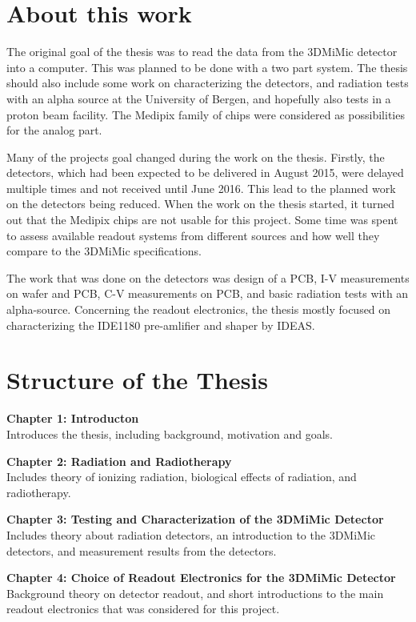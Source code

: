 \documentclass[../main/thesis.tex]{subfiles}
\begin{document}
\section{About this work}
\label{i-goal}

The original goal of the thesis was to read the data from the 3DMiMic detector into a computer. This was planned to be done with a two part system. The thesis should also include some work on characterizing the detectors, and radiation tests with an alpha source at the University of Bergen, and hopefully also tests in a proton beam facility. The Medipix family of chips were considered as possibilities for the analog part.

Many of the projects goal changed during the work on the thesis. Firstly, the detectors, which had been expected to be delivered in August 2015, were delayed multiple times and not received until June 2016. This lead to the planned work on the detectors being reduced. When the work on the thesis started, it turned out that the Medipix chips are not usable for this project. Some time was spent to assess available readout systems from different sources and how well they compare to the 3DMiMic specifications.

The work that was done on the detectors was design of a PCB, I-V measurements on wafer and PCB, C-V measurements on PCB, and basic radiation tests with an alpha-source. Concerning the readout electronics, the thesis mostly focused on characterizing the IDE1180 pre-amlifier and shaper by IDEAS.

\section{Structure of the Thesis}
\label{i-structure}
\textbf{Chapter 1: Introducton}\\
Introduces the thesis, including background, motivation and goals.

\textbf{Chapter 2: Radiation and Radiotherapy}\\
Includes theory of ionizing radiation, biological effects of radiation, and radiotherapy.

\textbf{Chapter 3: Testing and Characterization of the 3DMiMic Detector}\\
Includes theory about radiation detectors, an introduction to the 3DMiMic detectors, and measurement results from the detectors.

\textbf{Chapter 4: Choice of Readout Electronics for the 3DMiMic Detector}\\
Background theory on detector readout, and short introductions to the main readout electronics that was considered for this project.
\end{document}
